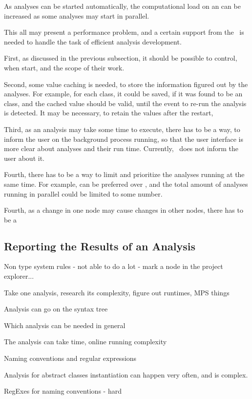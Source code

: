 As analyses can be started automatically, the computational load on an  can be increased as some analyses
may start in parallel. 

This all may present a performance problem, and a certain support from the \jbmps\ is needed to handle the task
of efficient analysis development.

First, as discussed in the previous subsection, it should be possible to control, when  start,
and the scope of their work. 

Second, some value caching is needed, to store the information figured out by the analyses. For example, for each
class, it could be saved, if it was found to be an  class, and the cached value should be valid, until
the event to re-run the analysis is detected. It may be necessary, to retain the values after the  restart,

Third, as an analysis may take some time to execute, there has to be a way, to inform the user on the background process
running, so that the user interface is more clear about analyses and their run time. Currently, \jbmps\ does not inform
the user about it.

Fourth, there has to be a way to limit and prioritize the analyses running at the same time. For example, 
can be preferred over , and the total amount of analyses running in parallel could be limited 
to some number.



Fourth, as a change in one node may cause changes in other nodes, there has to be a




\subsection{Reporting the Results of an Analysis}
\label{reportinganalysis}

Non type system rules - not able to do a lot - mark a node in the project explorer...

Take one analysis, research its complexity, figure out runtimes, MPS things

 Analysis can go on the syntax tree

 Which analysis can be needed in general
 
 The analysis can take time, online running complexity
 
 Naming conventions and regular expressions


 Analysis for abstract classes instantiation can happen very often, and is complex.
 
 
 
 RegExes for naming conventions - hard
